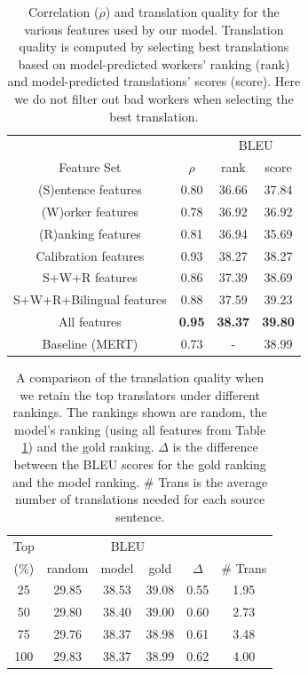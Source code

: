 \documentclass[11pt,letterpaper]{article}
\begin{document}
\begin{table}[htbp]
 \center
\begin{tabular}{c|c|cc}
\hline
 & & \multicolumn{2}{c}{BLEU}\\
Feature Set             & $\rho$  & rank & score    \\ \hhline{====}
(S)entence features     & 0.80 & 36.66 &37.84 \\
(W)orker features       & 0.78 & 36.92 &36.92 \\
(R)anking features      & 0.81 & 36.94 &35.69\\
Calibration features  & 0.93 & 38.27 &38.27\\
S+W+R features          & 0.86 & 37.39 & 38.69\\
S+W+R+Bilingual features        & 0.88 & 37.59 &39.23 \\
All features            & \textbf{0.95} & \textbf{38.37} & \textbf{39.80}\\ \hhline{====}
Baseline (MERT) &0.73&-&38.99\\ \hline
\end{tabular}
\caption{\label{lrresult} Correlation ($\rho$) and translation quality for the various features used by our model.  Translation quality is computed by selecting best translations based on model-predicted workers' ranking (rank) and model-predicted translations' scores (score). Here we do not filter out bad workers when selecting the best translation.}
\end{table}



\begin{table}[htbp]
\center
\begin{tabular}{c|ccccc}
\hline
Top & \multicolumn{4}{c}{BLEU}&\\
 (\%) &random & model & gold & $\Delta$ & \# Trans\\\hhline{======}
25      &29.85& 38.53   & 39.08      & 0.55   & 1.95         \\
50      &29.80& 38.40   & 39.00      & 0.60   & 2.73         \\
75      &29.76& 38.37   & 38.98      & 0.61   & 3.48         \\
100     &29.83& 38.37   & 38.99      & 0.62   & 4.00         \\ \hline
\end{tabular}
\caption{\label{modeltoprank} A comparison of the translation quality when we retain the top translators under different rankings.  The rankings shown are random, the model's ranking (using all features from Table \ref{lrresult}) and the gold ranking.  $\Delta$ is the difference between the BLEU scores for the gold ranking and the model ranking. \# Trans is the average number of translations needed for each source sentence. 
}
\end{table} 
\end{document}

